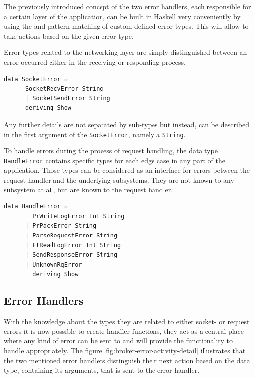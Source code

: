 The previously introduced concept of the two error handlers, each responsible
for a certain layer of the application, can be built in Haskell very
conveniently by using the 
and pattern matching of custom defined error types. This will allow to take
actions based on the given error type.  

Error types related to the networking layer are simply distinguished between an
error occurred either in the receiving or responding process.

\begin{lstlisting}[caption={SocketError type}]
data SocketError =
      SocketRecvError String
      | SocketSendError String
      deriving Show
\end{lstlisting}

Any further details are not separated by sub-types but instead, can be described
in the first argument of the \lstinline{SocketError}, namely a
\lstinline{String}.

To handle errors during the process of request handling, the data type
\lstinline{HandleError} contains specific types for each edge case in any part
of the application. Those types can be considered as an interface for errors
between the request handler and the underlying subsystems. They are not known to
any subsystem at all, but are known to the request handler.

\begin{lstlisting}[caption={Handle Error type}]
data HandleError =
        PrWriteLogError Int String
      | PrPackError String
      | ParseRequestError String
      | FtReadLogError Int String
      | SendResponseError String
      | UnknownRqError
        deriving Show
\end{lstlisting}

\subsection{Error Handlers}

With the knowledge about the types they are related to either socket- or request
errors it is now possible to create handler functions, they act as a central
place where any kind of error can be sent to and will provide the
functionality to handle appropriately. The figure
\ref{fig:broker-error-activity-detail} illustrates that the two
mentioned error handlers distinguish their next action based on the data type,
containing its arguments, that is sent to the error handler.

